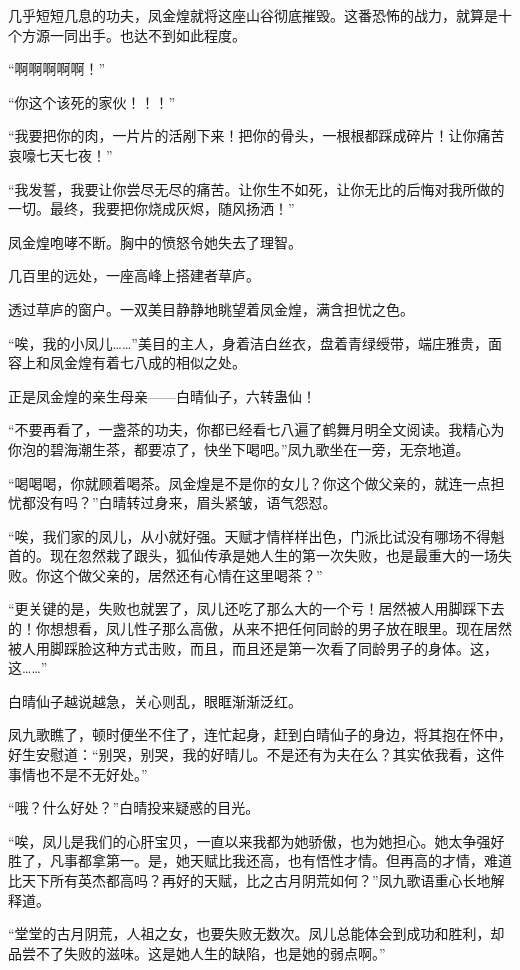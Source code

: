 \begin{this_body}
几乎短短几息的功夫，凤金煌就将这座山谷彻底摧毁。这番恐怖的战力，就算是十个方源一同出手。也达不到如此程度。

“啊啊啊啊啊！”

“你这个该死的家伙！！！”

“我要把你的肉，一片片的活剐下来！把你的骨头，一根根都踩成碎片！让你痛苦哀嚎七天七夜！”

“我发誓，我要让你尝尽无尽的痛苦。让你生不如死，让你无比的后悔对我所做的一切。最终，我要把你烧成灰烬，随风扬洒！”

凤金煌咆哮不断。胸中的愤怒令她失去了理智。

几百里的远处，一座高峰上搭建者草庐。

透过草庐的窗户。一双美目静静地眺望着凤金煌，满含担忧之色。

“唉，我的小凤儿……”美目的主人，身着洁白丝衣，盘着青绿绶带，端庄雅贵，面容上和凤金煌有着七八成的相似之处。

正是凤金煌的亲生母亲——白晴仙子，六转蛊仙！

“不要再看了，一盏茶的功夫，你都已经看七八遍了鹤舞月明全文阅读。我精心为你泡的碧海潮生茶，都要凉了，快坐下喝吧。”凤九歌坐在一旁，无奈地道。

“喝喝喝，你就顾着喝茶。凤金煌是不是你的女儿？你这个做父亲的，就连一点担忧都没有吗？”白晴转过身来，眉头紧皱，语气怨怼。

“唉，我们家的凤儿，从小就好强。天赋才情样样出色，门派比试没有哪场不得魁首的。现在忽然栽了跟头，狐仙传承是她人生的第一次失败，也是最重大的一场失败。你这个做父亲的，居然还有心情在这里喝茶？”

“更关键的是，失败也就罢了，凤儿还吃了那么大的一个亏！居然被人用脚踩下去的！你想想看，凤儿性子那么高傲，从来不把任何同龄的男子放在眼里。现在居然被人用脚踩脸这种方式击败，而且，而且还是第一次看了同龄男子的身体。这，这……”

白晴仙子越说越急，关心则乱，眼眶渐渐泛红。

凤九歌瞧了，顿时便坐不住了，连忙起身，赶到白晴仙子的身边，将其抱在怀中，好生安慰道：“别哭，别哭，我的好晴儿。不是还有为夫在么？其实依我看，这件事情也不是不无好处。”

“哦？什么好处？”白晴投来疑惑的目光。

“唉，凤儿是我们的心肝宝贝，一直以来我都为她骄傲，也为她担心。她太争强好胜了，凡事都拿第一。是，她天赋比我还高，也有悟性才情。但再高的才情，难道比天下所有英杰都高吗？再好的天赋，比之古月阴荒如何？”凤九歌语重心长地解释道。

“堂堂的古月阴荒，人祖之女，也要失败无数次。凤儿总能体会到成功和胜利，却品尝不了失败的滋味。这是她人生的缺陷，也是她的弱点啊。”


\end{this_body}
